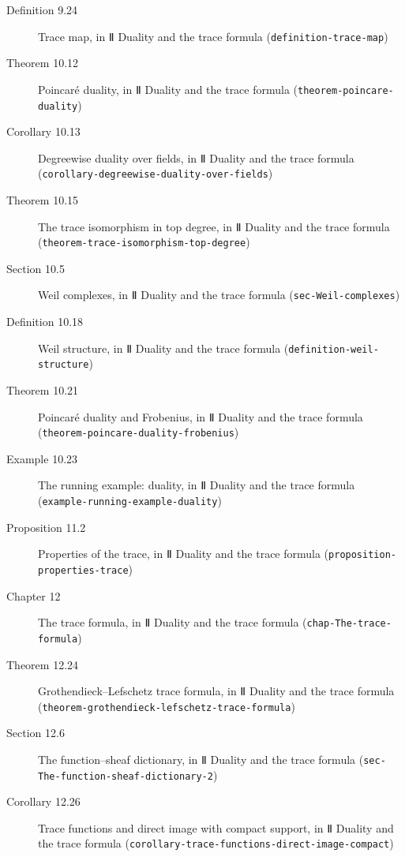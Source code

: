 \documentclass[11pt]{article}
\newcommand{\bpslug}[1]{\texttt{#1}}
\begin{document}
\begin{description}
\item[Definition 9.24] Trace map, in Ⅱ Duality and the trace formula (\bpslug{definition-{}\allowbreak{}trace-{}\allowbreak{}map})
\item[Theorem 10.12] Poincaré duality, in Ⅱ Duality and the trace formula (\bpslug{theorem-{}\allowbreak{}poincare-{}\allowbreak{}duality})
\item[Corollary 10.13] Degreewise duality over fields, in Ⅱ Duality and the trace formula (\bpslug{corollary-{}\allowbreak{}degreewise-{}\allowbreak{}duality-{}\allowbreak{}over-{}\allowbreak{}fields})
\item[Theorem 10.15] The trace isomorphism in top degree, in Ⅱ Duality and the trace formula (\bpslug{theorem-{}\allowbreak{}trace-{}\allowbreak{}isomorphism-{}\allowbreak{}top-{}\allowbreak{}degree})
\item[Section 10.5] Weil complexes, in Ⅱ Duality and the trace formula (\bpslug{sec-{}\allowbreak{}Weil-{}\allowbreak{}complexes})
\item[Definition 10.18] Weil structure, in Ⅱ Duality and the trace formula (\bpslug{definition-{}\allowbreak{}weil-{}\allowbreak{}structure})
\item[Theorem 10.21] Poincaré duality and Frobenius, in Ⅱ Duality and the trace formula (\bpslug{theorem-{}\allowbreak{}poincare-{}\allowbreak{}duality-{}\allowbreak{}frobenius})
\item[Example 10.23] The running example: duality, in Ⅱ Duality and the trace formula (\bpslug{example-{}\allowbreak{}running-{}\allowbreak{}example-{}\allowbreak{}duality})
\item[Proposition 11.2] Properties of the trace, in Ⅱ Duality and the trace formula (\bpslug{proposition-{}\allowbreak{}properties-{}\allowbreak{}trace})
\item[Chapter 12] The trace formula, in Ⅱ Duality and the trace formula (\bpslug{chap-{}\allowbreak{}The-{}\allowbreak{}trace-{}\allowbreak{}formula})
\item[Theorem 12.24] Grothendieck–Lefschetz trace formula, in Ⅱ Duality and the trace formula (\bpslug{theorem-{}\allowbreak{}grothendieck-{}\allowbreak{}lefschetz-{}\allowbreak{}trace-{}\allowbreak{}formula})
\item[Section 12.6] The function–sheaf dictionary, in Ⅱ Duality and the trace formula (\bpslug{sec-{}\allowbreak{}The-{}\allowbreak{}function-{}\allowbreak{}sheaf-{}\allowbreak{}dictionary-{}\allowbreak{}2})
\item[Corollary 12.26] Trace functions and direct image with compact support, in Ⅱ Duality and the trace formula (\bpslug{corollary-{}\allowbreak{}trace-{}\allowbreak{}functions-{}\allowbreak{}direct-{}\allowbreak{}image-{}\allowbreak{}compact})

\end{description}
\end{document}
